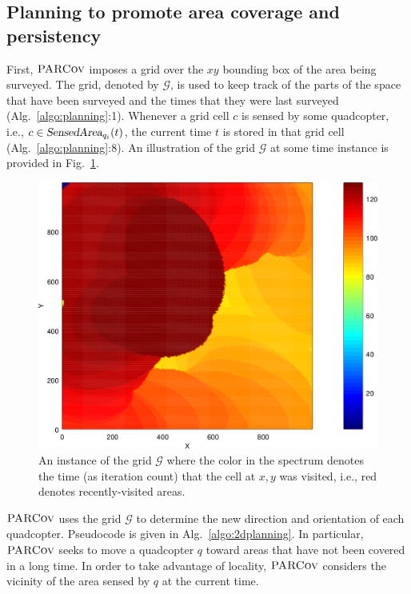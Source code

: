 \documentclass[letterpaper, 10pt, conference]{ieeeconf}
\newcommand{\Symbol}[1]{\ensuremath{\mathcal{#1}}}
\newcommand{\Function}[1]{\ensuremath{{ \textsc{#1}}}}
\newcommand{\Var}[1]{\ensuremath{{{\textsl{#1}}}}}
\newcommand{\Name}{\Function{\small{PARCov}}}
\begin{document}
\subsection{Planning to promote area coverage and persistency}
\label{sec:Planning2D}

First, $\Name$ imposes a grid over the $xy$ bounding box of the area
being surveyed. The grid, denoted by $\Symbol{G}$, is used to keep
track of the parts of the space that have been surveyed and the times
that they were last surveyed (Alg.~\ref{algo:planning}:1). Whenever a
grid cell $c$ is sensed by some quadcopter, i.e., $c \in
\Var{SensedArea}_{q_i}(t)$,  the current time $t$ is stored in that grid cell
(Alg.~\ref{algo:planning}:8).
An illustration of the grid $\Symbol{G}$ at some
time instance is provided in
Fig.~\ref{fig:timegrid}.

\begin{figure}[h]
\centering
\includegraphics[width=0.7\columnwidth]{usef/grid}

\caption{An instance of the grid $\Symbol{G}$ where the color in the spectrum
denotes the time (as iteration count) that the cell at $x, y$ was visited, i.e., red denotes recently-visited areas.}
\label{fig:timegrid}
\end{figure}

\noindent
$\Name$ uses the grid $\Symbol{G}$ to determine the new direction
and orientation of each
quadcopter. Pseudocode is given in Alg.~\ref{algo:2dplanning}. In
particular, $\Name$ seeks to move a quadcopter $q$ toward areas that
have not been covered in a long time. In order to take advantage of
locality, $\Name$ considers the vicinity of the area sensed by $q$
at the current time.
\end{document}
